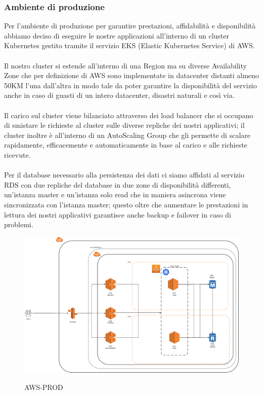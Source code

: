 \documentclass{article}
\begin{document}
\subsubsection{Ambiente di produzione}
Per l’ambiente di produzione per garantire prestazioni, affidabilità e disponibilità abbiamo deciso di eseguire le nostre applicazioni all’interno di un cluster Kubernetes gestito tramite il servizio EKS (Elastic Kubernetes Service) di AWS.\\
\\
Il nostro cluster si estende all’interno di una Region ma su diverse Availability Zone che per definizione di AWS sono implementate in datacenter distanti almeno 50KM l’una dall’altra in modo tale da poter garantire la disponibilità del servizio anche in caso di guasti di un intero datacenter, disastri naturali e così via.\\
\\
Il carico sul cluster viene bilanciato attraverso dei load balancer che si occupano di smistare le richieste al cluster sulle diverse repliche dei nostri applicativi; il cluster inoltre è all’interno di un AutoScaling Group che gli permette di scalare rapidamente, efficacemente e automaticamente in base al carico e alle richieste ricevute.\\
\\
Per il database necessario alla persistenza dei dati ci siamo affidati al servizio RDS con due repliche del database in due zone di disponibilità differenti, un’istanza master e un’istanza solo read che in maniera asincrona viene sincronizzata con l’istanza master; questo oltre che aumentare le prestazioni in lettura dei nostri applicativi garantisce anche backup e failover in caso di problemi.
\begin{figure}[h!]
\centering
\includegraphics[scale=0.26]{AWS-PROD.png}
\label{fig:AWS-PROD}
\caption{AWS-PROD}
\end{figure}
\end{document}
